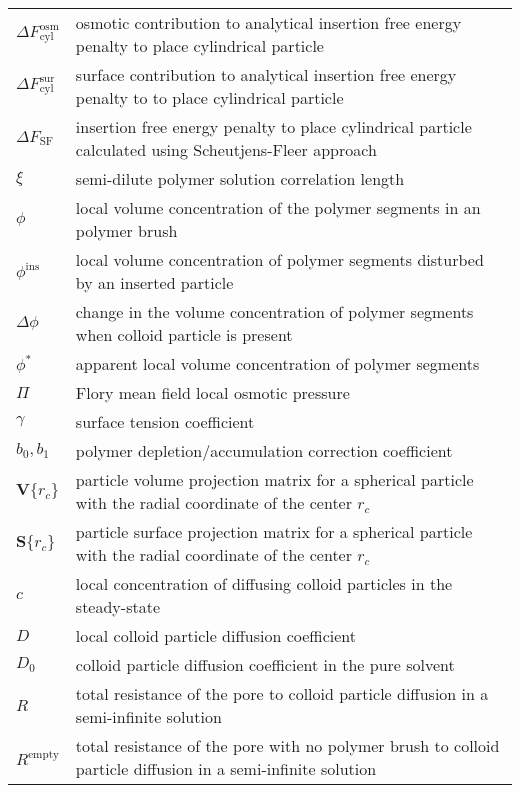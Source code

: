 \documentclass[10pt, a4paper]{article}
\begin{document}
\begin{tabularx}{\linewidth}{l l}
$\Delta F_{\textrm{cyl}}^{\textrm{osm}}$ & osmotic contribution to analytical insertion free energy penalty to place cylindrical particle \\
$\Delta F_{\textrm{cyl}}^{\textrm{sur}}$ & surface contribution to analytical insertion free energy penalty to to place cylindrical particle \\
$\Delta F_{\textrm{SF}}$ & insertion free energy penalty to place cylindrical particle calculated using Scheutjens-Fleer approach \\
$\xi$ & semi-dilute polymer solution correlation length \\
$\phi$ & local volume concentration of the polymer segments in an polymer brush\\
$\phi^{\textrm{ins}}$ & local volume concentration of polymer segments disturbed by an inserted particle\\
$\Delta \phi$ & change in the volume concentration of polymer segments when colloid particle is present \\
$\phi^{\ast}$ & apparent local volume concentration of polymer segments \\
$\Pi$ & Flory mean field local osmotic pressure \\
$\gamma$ & surface tension coefficient \\
$b_0, b_1$ & polymer depletion/accumulation correction coefficient \\
$\textbf{V}\{r_{c}\}$ & particle volume projection matrix for a spherical particle with the radial coordinate of the center $r_{c}$ \\
$\textbf{S}\{r_{c}\}$ & particle surface projection matrix for a spherical particle with the radial coordinate of the center $r_{c}$ \\
$c$ & local concentration of diffusing colloid particles in the steady-state \\
$D$ & local colloid particle diffusion coefficient \\
$D_0$ & colloid particle diffusion coefficient in the pure solvent \\
$R$ & total resistance of the pore to colloid particle diffusion in a semi-infinite solution \\
$R^{\textrm{empty}}$ & total resistance of the pore with no polymer brush to colloid particle diffusion in a semi-infinite solution \\

\end{tabularx}
\end{document}

